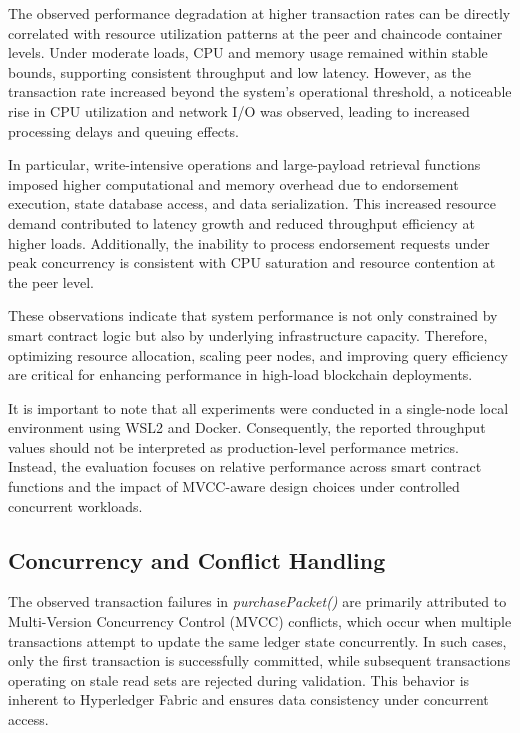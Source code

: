 \documentclass[12pt]{article}
\begin{document}
	
	The observed performance degradation at higher transaction rates can be directly correlated with resource utilization patterns at the peer and chaincode container levels. Under moderate loads, CPU and memory usage remained within stable bounds, supporting consistent throughput and low latency. However, as the transaction rate increased beyond the system’s operational threshold, a noticeable rise in CPU utilization and network I/O was observed, leading to increased processing delays and queuing effects.
	
	In particular, write-intensive operations and large-payload retrieval functions imposed higher computational and memory overhead due to endorsement execution, state database access, and data serialization. This increased resource demand contributed to latency growth and reduced throughput efficiency at higher loads. Additionally, the inability to process endorsement requests under peak concurrency is consistent with CPU saturation and resource contention at the peer level.
	
	These observations indicate that system performance is not only constrained by smart contract logic but also by underlying infrastructure capacity. Therefore, optimizing resource allocation, scaling peer nodes, and improving query efficiency are critical for enhancing performance in high-load blockchain deployments.
	
	
	It is important to note that all experiments were conducted in a single-node local environment using WSL2 and Docker. Consequently, the reported throughput values should not be interpreted as production-level performance metrics. Instead, the evaluation focuses on relative performance across smart contract functions and the impact of MVCC-aware design choices under controlled concurrent workloads.
	
	\subsection{Concurrency and Conflict Handling}
	
	The observed transaction failures in \textit{purchasePacket()} are primarily attributed to Multi-Version Concurrency Control (MVCC) conflicts, which occur when multiple transactions attempt to update the same ledger state concurrently. In such cases, only the first transaction is successfully committed, while subsequent transactions operating on stale read sets are rejected during validation. This behavior is inherent to Hyperledger Fabric and ensures data consistency under concurrent access.
	
\end{document}
